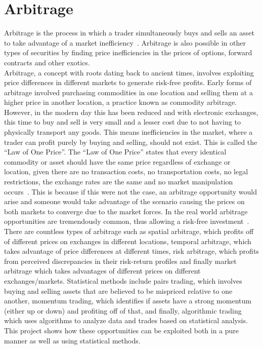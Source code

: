 \section{Arbitrage}
Arbitrage is the process in which a trader simultaneously buys and sells an asset to take advantage of a market inefficiency~\cite{businessinsightsblog_2021}. Arbitrage is also possible in other types of securities by finding price inefficiencies in the prices of options, forward contracts and other exotics.
\\[3mm]
Arbitrage, a concept with roots dating back to ancient times, involves exploiting price differences in different markets to generate risk-free profits.  Early forms of arbitrage involved purchasing commodities in one location and selling them at a higher price in another location, a practice known as commodity arbitrage. However, in the modern day this has been reduced and with electronic exchanges, this time to buy and sell is very small and a lesser cost due to not having to physically transport any goods. This means inefficiencies in the market, where a trader can profit purely by buying and selling, should not exist. This is called the ``Law of One Price''. The ``Law of One Price'' states that every identical commodity or asset should have the same price regardless of exchange or location, given there are no transaction costs, no transportation costs, no legal restrictions, the exchange rates are the same and no market manipulation occurs~\cite{noauthor_law_nodate}. This is because if this were not the case, an arbitrage opportunity would arise and someone would take advantage of the scenario causing the prices on both markets to converge due to the market forces. In the real world arbitrage opportunities are tremendously common, thus allowing a risk-free investment~\cite{10.2307/1828075, RICHARDSON1978341}.
\\[3mm]
There are countless types of arbitrage such as spatial arbitrage, which profits off of different prices on exchanges in different locations, temporal arbitrage, which takes advantage of price differences at different times, risk arbitrage, which profits from perceived discrepancies in their risk-return profiles and finally market arbitrage which takes advantages of different prices on different exchanges/markets. Statistical methods include pairs trading, which involves buying and selling assets that are believed to be mispriced relative to one another, momentum trading, which identifies if assets have a strong momentum (either up or down) and profiting off of that, and finally, algorithmic trading which uses algorithms to analyze data and trades based on statistical analysis. This project shows how these opportunities can be exploited both in a pure manner as well as using statistical methods.

